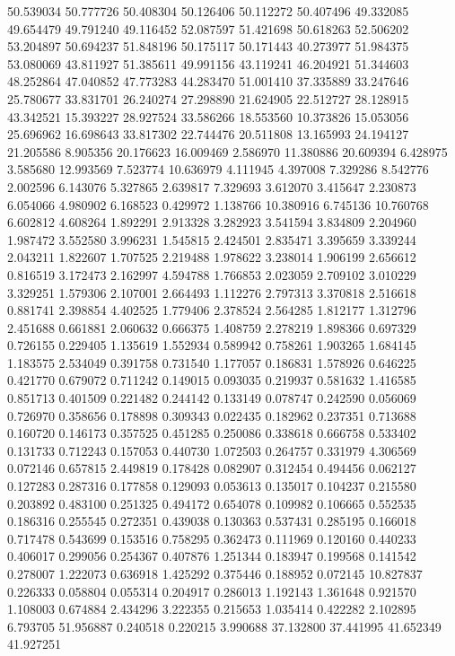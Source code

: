 50.539034
50.777726
50.408304
50.126406
50.112272
50.407496
49.332085
49.654479
49.791240
49.116452
52.087597
51.421698
50.618263
52.506202
53.204897
50.694237
51.848196
50.175117
50.171443
40.273977
51.984375
53.080069
43.811927
51.385611
49.991156
43.119241
46.204921
51.344603
48.252864
47.040852
47.773283
44.283470
51.001410
37.335889
33.247646
25.780677
33.831701
26.240274
27.298890
21.624905
22.512727
28.128915
43.342521
15.393227
28.927524
33.586266
18.553560
10.373826
15.053056
25.696962
16.698643
33.817302
22.744476
20.511808
13.165993
24.194127
21.205586
8.905356
20.176623
16.009469
2.586970
11.380886
20.609394
6.428975
3.585680
12.993569
7.523774
10.636979
4.111945
4.397008
7.329286
8.542776
2.002596
6.143076
5.327865
2.639817
7.329693
3.612070
3.415647
2.230873
6.054066
4.980902
6.168523
0.429972
1.138766
10.380916
6.745136
10.760768
6.602812
4.608264
1.892291
2.913328
3.282923
3.541594
3.834809
2.204960
1.987472
3.552580
3.996231
1.545815
2.424501
2.835471
3.395659
3.339244
2.043211
1.822607
1.707525
2.219488
1.978622
3.238014
1.906199
2.656612
0.816519
3.172473
2.162997
4.594788
1.766853
2.023059
2.709102
3.010229
3.329251
1.579306
2.107001
2.664493
1.112276
2.797313
3.370818
2.516618
0.881741
2.398854
4.402525
1.779406
2.378524
2.564285
1.812177
1.312796
2.451688
0.661881
2.060632
0.666375
1.408759
2.278219
1.898366
0.697329
0.726155
0.229405
1.135619
1.552934
0.589942
0.758261
1.903265
1.684145
1.183575
2.534049
0.391758
0.731540
1.177057
0.186831
1.578926
0.646225
0.421770
0.679072
0.711242
0.149015
0.093035
0.219937
0.581632
1.416585
0.851713
0.401509
0.221482
0.244142
0.133149
0.078747
0.242590
0.056069
0.726970
0.358656
0.178898
0.309343
0.022435
0.182962
0.237351
0.713688
0.160720
0.146173
0.357525
0.451285
0.250086
0.338618
0.666758
0.533402
0.131733
0.712243
0.157053
0.440730
1.072503
0.264757
0.331979
4.306569
0.072146
0.657815
2.449819
0.178428
0.082907
0.312454
0.494456
0.062127
0.127283
0.287316
0.177858
0.129093
0.053613
0.135017
0.104237
0.215580
0.203892
0.483100
0.251325
0.494172
0.654078
0.109982
0.106665
0.552535
0.186316
0.255545
0.272351
0.439038
0.130363
0.537431
0.285195
0.166018
0.717478
0.543699
0.153516
0.758295
0.362473
0.111969
0.120160
0.440233
0.406017
0.299056
0.254367
0.407876
1.251344
0.183947
0.199568
0.141542
0.278007
1.222073
0.636918
1.425292
0.375446
0.188952
0.072145
10.827837
0.226333
0.058804
0.055314
0.204917
0.286013
1.192143
1.361648
0.921570
1.108003
0.674884
2.434296
3.222355
0.215653
1.035414
0.422282
2.102895
6.793705
51.956887
0.240518
0.220215
3.990688
37.132800
37.441995
41.652349
41.927251
